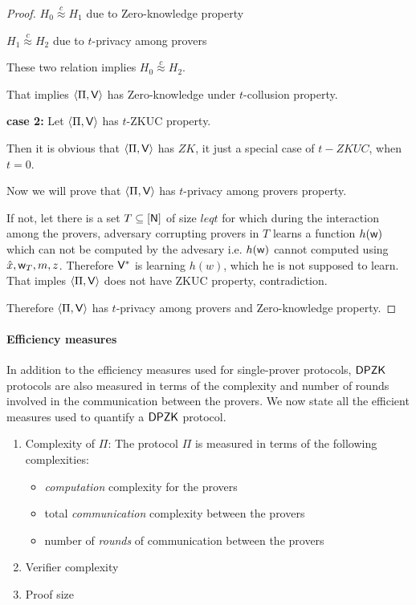 \begin{proof}
	$H_0 \stackrel{c}{\approx} H_1$ due to Zero-knowledge property
	
	$H_1 \stackrel{c}{\approx} H_2$ due to $t$-privacy among provers
	
	These two relation implies $H_0 \stackrel{c}{\approx} H_2$.
	
	That implies $\langle \Pi,\mathsf{V}\rangle$ has Zero-knowledge under $t$-collusion property.
	
	\textbf{case 2:} Let $\langle \Pi,\mathsf{V}\rangle$ has $t$-ZKUC property.
	
	Then it is obvious that $\langle \Pi,\mathsf{V}\rangle$ has $ZK$, it just a special case of $t-ZKUC$, when $t=0$.
	
	Now we will prove that $\langle \Pi,\mathsf{V}\rangle$ has $t$-privacy among provers property. 
	
	If not, let there is a set $T\subseteq [\mathsf{N}]$ of size $leq t$ for which during the interaction among the provers, adversary corrupting provers in $T$ learns a function $h(\mathsf{w})$ which can not be computed by the advesary i.e. $h(\mathsf{w})$ cannot computed using $\hat{x}, \mathsf{w}_T, m, z$. Therefore $\mathsf{V}^*$ is learning $h(w)$, which he is not supposed to learn. That imples $\langle \Pi,\mathsf{V}\rangle$ does not have ZKUC property, contradiction.
	
	Therefore $\langle \Pi,\mathsf{V}\rangle$ has $t$-privacy among provers and Zero-knowledge property.
\end{proof}


\paragraph{Efficiency measures}
In addition to the efficiency measures used for single-prover protocols, $\mathsf{DPZK}$ protocols are also measured in terms of the complexity and number of rounds involved in the communication between the provers. We now state all the efficient measures used to quantify a $\mathsf{DPZK}$ protocol.
\begin{enumerate}
\item Complexity of $\Pi$: The protocol $\Pi$ is measured in terms of the following complexities:
\begin{itemize}
\item \textit{computation} complexity for the provers
\item total \textit{communication} complexity between the provers
\item number of \textit{rounds} of communication between the provers
\end{itemize}
\item Verifier complexity
\item Proof size
\end{enumerate}

